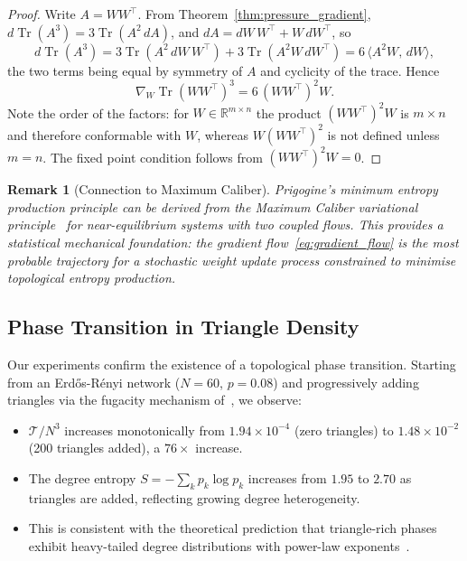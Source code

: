 \documentclass[11pt,a4paper]{article}
\newtheorem{remark}{Remark}
\begin{document}
\begin{proof}
Write $A = WW^\top$. From Theorem~\ref{thm:pressure_gradient},
$d\operatorname{Tr}(A^3) = 3\operatorname{Tr}(A^2\,dA)$, and
$dA = dW\,W^\top + W\,dW^\top$, so
\[
d\operatorname{Tr}(A^3)
= 3\operatorname{Tr}(A^2\,dW\,W^\top) + 3\operatorname{Tr}(A^2 W\,dW^\top)
= 6\,\langle A^2 W,\, dW\rangle ,
\]
the two terms being equal by symmetry of $A$ and cyclicity of the
trace. Hence
\begin{equation}
\nabla_W \operatorname{Tr}(WW^\top)^3 = 6\,(WW^\top)^2 W .
\label{eq:grad_W}
\end{equation}
Note the order of the factors: for $W \in \mathbb{R}^{m \times n}$ the
product $(WW^\top)^2 W$ is $m \times n$ and therefore conformable with
$W$, whereas $W(WW^\top)^2$ is not defined unless $m = n$. The fixed
point condition follows from $(WW^\top)^2 W = 0$.
\end{proof}

\begin{remark}[Connection to Maximum Caliber]
Prigogine's minimum entropy production principle can be derived from
the Maximum Caliber variational principle~\cite{maxcaliber2018} for
near-equilibrium systems with two coupled flows. This provides a
statistical mechanical foundation: the gradient flow~\eqref{eq:gradient_flow}
is the most probable trajectory for a stochastic weight update process
constrained to minimise topological entropy production.
\end{remark}

\subsection{Phase Transition in Triangle Density}

Our experiments confirm the existence of a topological phase transition.
Starting from an Erdős-Rényi network ($N=60$, $p=0.08$) and
progressively adding triangles via the fugacity mechanism
of~\cite{motif2026}, we observe:
\begin{itemize}
\item $\mathcal{T}/N^3$ increases monotonically from $1.94 \times 10^{-4}$
      (zero triangles) to $1.48 \times 10^{-2}$ (200 triangles added),
      a $76\times$ increase.
\item The degree entropy $S = -\sum_k p_k \log p_k$ increases from
      $1.95$ to $2.70$ as triangles are added, reflecting growing
      degree heterogeneity.
\item This is consistent with the theoretical prediction that
      triangle-rich phases exhibit heavy-tailed degree distributions
      with power-law exponents~\cite{motif2026}.
\end{itemize}
\end{document}
